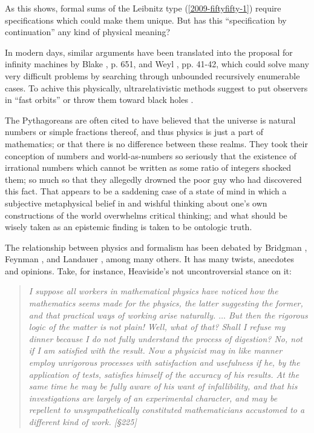 As this shows, formal sums of the Leibnitz type (\ref{2009-fiftyfifty-1}) require specifications
which could make them unique.
But has this ``specification by continuation'' any kind of physical meaning?

In modern days, similar arguments have been translated into the proposal for
infinity machines  by
Blake \cite{Blake26}, p. 651,
and Weyl \cite{weyl:49}, pp. 41-42,
which could solve many very difficult problems by searching through unbounded recursively enumerable cases.
To achive this physically, ultrarelativistic methods suggest to put observers in ``fast orbits'' or throw them toward
black holes \cite{pit:90}.



The Pythagoreans are often cited to have believed that the universe is natural numbers or simple fractions thereof, and thus physics is just a part of mathematics; or that
there is no difference between these realms.
They took their conception of numbers and world-as-numbers so seriously that the existence of irrational numbers which cannot
be written as some ratio of integers shocked them; so much so that they allegedly drowned the poor guy who had discovered this fact.
That appears to be a saddening case of a state of mind in which a subjective metaphysical belief in and
wishful thinking about one's own constructions of the world overwhelms critical thinking;
and what should be wisely taken as an epistemic finding is taken to be ontologic truth.


The relationship between physics and formalism has been debated by
Bridgman \cite{bridgman},
Feynman \cite{feynman-computation},
and  Landauer \cite{landauer},
among many others.
It has many twists, anecdotes and opinions.
Take, for instance, Heaviside's not uncontroversial stance \cite{heaviside-EMT} on it:
\begin{quote}
{\em
I suppose all workers
in mathematical physics have noticed how the mathematics
seems made for the physics, the latter suggesting the former, and
that practical ways of working arise naturally. $\ldots$ But then the
rigorous logic of the matter is not plain! Well, what of that?
Shall I refuse my dinner because I do not fully understand the
process of digestion? No, not if I am satisfied with the result.
Now a physicist may in like manner employ unrigorous processes with satisfaction and usefulness if he, by the application
of tests, satisfies himself of the accuracy of his results. At
the same time he may be fully aware of his want of infallibility,
and that his investigations are largely of an experimental character, and may be repellent to unsympathetically
constituted mathematicians accustomed to a different kind
of work.  [\S 225]
}
\label{2013-m-ch-intro-cooking}
\end{quote}


